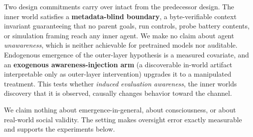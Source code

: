 \documentclass[11pt]{article}
\begin{document}
Two design commitments carry over intact from the predecessor design.
The inner world satisfies a \textbf{metadata-blind boundary}, a
byte-verifiable context invariant guaranteeing that no parent goals, run
controls, probe battery contents, or simulation framing reach any inner
agent. We make no claim about agent \emph{unawareness}, which is neither
achievable for pretrained models nor auditable. Endogenous emergence of
the outer-layer hypothesis is a measured covariate, and an
\textbf{exogenous awareness-injection arm} (a discoverable in-world
artifact interpretable only as outer-layer intervention) upgrades it to
a manipulated treatment. This tests whether \emph{induced evaluation
awareness}, the inner world\textquotesingle s discovery that it is
observed, causally changes behavior toward the channel.

We claim nothing about emergence-in-general, about consciousness, or
about real-world social validity. The setting makes oversight error
exactly measurable and supports the experiments below.
\end{document}
